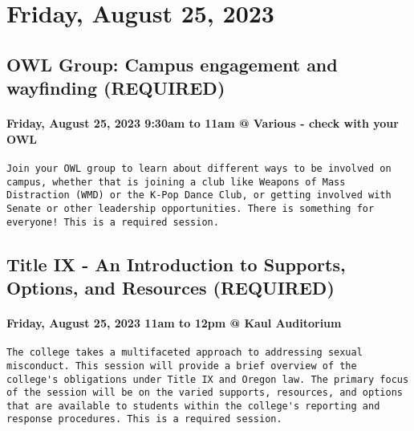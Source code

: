 \documentclass[
]{article}
\author{}
\date{\vspace{-2.5em}}
\begin{document}
\hypertarget{friday-august-25-2023}{%
\section{Friday, August 25, 2023}\label{friday-august-25-2023}}

\hypertarget{owl-group-campus-engagement-and-wayfinding-required}{%
\subsection{OWL Group: Campus engagement and wayfinding
(REQUIRED)}\label{owl-group-campus-engagement-and-wayfinding-required}}

\hypertarget{friday-august-25-2023-930am-to-11am-various---check-with-your-owl}{%
\paragraph{Friday, August 25, 2023 9:30am to 11am @ Various - check with
your
OWL}\label{friday-august-25-2023-930am-to-11am-various---check-with-your-owl}}

\begin{verbatim}
Join your OWL group to learn about different ways to be involved on campus, whether that is joining a club like Weapons of Mass Distraction (WMD) or the K-Pop Dance Club, or getting involved with Senate or other leadership opportunities. There is something for everyone! This is a required session.
\end{verbatim}

\hypertarget{title-ix---an-introduction-to-supports-options-and-resources-required}{%
\subsection{Title IX - An Introduction to Supports, Options, and
Resources
(REQUIRED)}\label{title-ix---an-introduction-to-supports-options-and-resources-required}}

\hypertarget{friday-august-25-2023-11am-to-12pm-kaul-auditorium}{%
\paragraph{Friday, August 25, 2023 11am to 12pm @ Kaul
Auditorium}\label{friday-august-25-2023-11am-to-12pm-kaul-auditorium}}

\begin{verbatim}
The college takes a multifaceted approach to addressing sexual misconduct. This session will provide a brief overview of the college's obligations under Title IX and Oregon law. The primary focus of the session will be on the varied supports, resources, and options that are available to students within the college's reporting and response procedures. This is a required session.
\end{verbatim}
\end{document}
